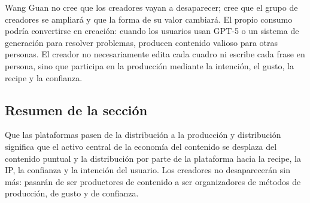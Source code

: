 Wang Guan no cree que los creadores vayan a desaparecer; cree que el grupo de creadores se ampliará y que la forma de su valor cambiará. El propio consumo podría convertirse en creación: cuando los usuarios usan GPT-5 o un sistema de generación para resolver problemas, producen contenido valioso para otras personas. El creador no necesariamente edita cada cuadro ni escribe cada frase en persona, sino que participa en la producción mediante la intención, el gusto, la recipe y la confianza.

\subsection{Resumen de la sección}

Que las plataformas pasen de la distribución a la producción y distribución significa que el activo central de la economía del contenido se desplaza del contenido puntual y la distribución por parte de la plataforma hacia la recipe, la IP, la confianza y la intención del usuario. Los creadores no desaparecerán sin más: pasarán de ser productores de contenido a ser organizadores de métodos de producción, de gusto y de confianza.
